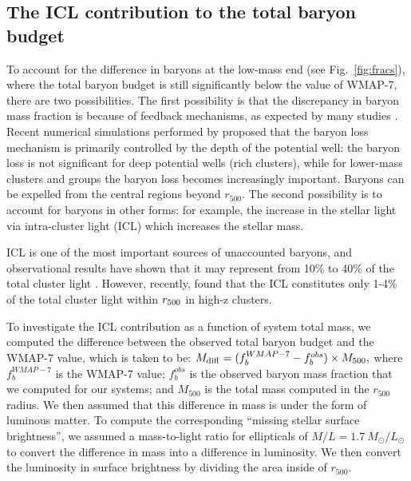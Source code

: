\documentclass{aa}
\begin{document}

\subsection{The ICL contribution to the total baryon budget}

To account for the difference in baryons at the low-mass end (see
Fig.~\ref{fig:fracs}), where the total baryon budget is still
significantly below the value of WMAP-7, there are two
possibilities. The first possibility is that the discrepancy in
baryon mass fraction is because of  feedback mechanisms, as expected by many studies
\citep[including][]{bregman07,giodini09}. Recent numerical
simulations performed by \citet{dai10} proposed that the baryon loss
mechanism is primarily controlled by the depth of the potential well:
the baryon loss is not
significant for deep potential wells (rich clusters), while for lower-mass clusters 
and groups the baryon loss
becomes increasingly important. Baryons can be expelled from the
central regions beyond $r_{500}$.  The second possibility is to
account for baryons in other forms: for example, the increase in the
stellar light via intra-cluster light (ICL) which increases the stellar
mass.

ICL is one of the most important sources of
unaccounted baryons, and observational results have shown that it
may represent from 10\% to 40\% of the total cluster light  
\citep[e.g.,][]{feldmeier02, zibetti05, kb07, gonzales07}.
However, recently, \citet{burke12} found that  the ICL constitutes only 1-4\% of the total
cluster light within $r_{\rm 500}$ in high-z clusters.

To investigate the ICL contribution as a function of system total mass, we computed 
the difference between the observed total baryon budget and the WMAP-7 value, which is taken to be:
$ M_{\rm diff}= (f_b^{WMAP-7}-f_b^{obs}) \times M_{500},$
where $f_b^{WMAP-7}$ is the WMAP-7 value; $f_b^{obs}$ is the observed
baryon mass fraction that we computed for our
systems; and $M_{500}$ is the total mass computed in the $r_{500}$
radius.
We then assumed that this difference in mass is under the form of
luminous matter. To compute  the corresponding ``missing stellar surface
brightness'', we assumed a mass-to-light ratio for ellipticals of $M/L= 1.7 
~M_{\odot}/L_{\odot}$ \citep{kauff03}  to convert the difference in
mass into a difference in luminosity. We then convert the luminosity in
surface brightness by dividing the area inside of $r_{500}$.
\end{document}
